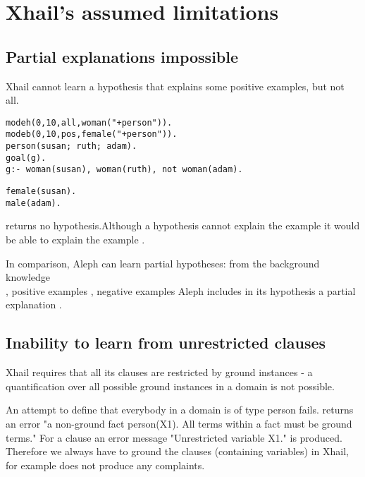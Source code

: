 \section{Xhail's assumed limitations}

\subsection{Partial explanations impossible}
Xhail cannot learn a hypothesis that explains some positive examples, but not all.

\begin{minipage}[t]{.60\textwidth}
\begin{lstlisting}
modeh(0,10,all,woman("+person")).
modeb(0,10,pos,female("+person")).
person(susan; ruth; adam).
goal(g).
g:- woman(susan), woman(ruth), not woman(adam).
\end{lstlisting}
\end{minipage}
\begin{minipage}[t]{.20\textwidth}
\begin{lstlisting}
female(susan).
male(adam).
\end{lstlisting}
\end{minipage}

returns no hypothesis.Although a hypothesis
 cannot explain the example  it would be able to explain the example .

In comparison, Aleph can learn partial hypotheses: from the background knowledge\\
, positive examples , negative examples  Aleph includes in its hypothesis a partial explanation
.

\subsection{Inability to learn from unrestricted clauses}\label{xhail_inability_to_learn_from_unrestricted_clauses}
Xhail requires that all its clauses are restricted by ground instances - a quantification over all possible ground instances in a domain is not possible.

An attempt to define that everybody in a domain is of type person fails.  returns an error "a non-ground fact person(X1). All terms within a fact must be ground terms." For a clause  an error message "Unrestricted variable X1." is produced. Therefore we always have to ground the clauses (containing variables) in Xhail, for example
 does not produce any complaints.

